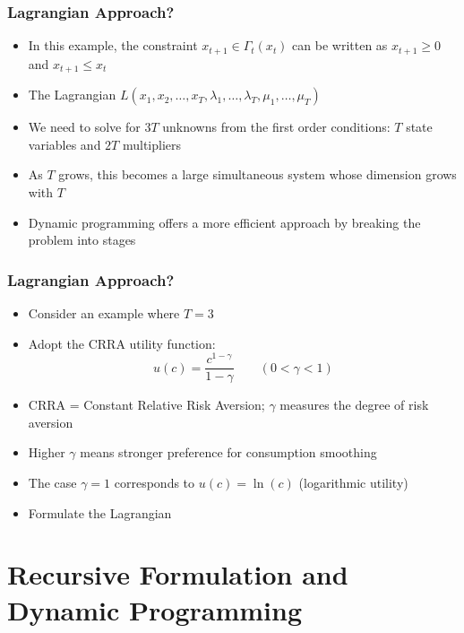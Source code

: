 \documentclass[9pt,aspectratio=169]{beamer}
\begin{document}
\begin{frame}
    \frametitle{Lagrangian Approach?}
    \begin{itemize}
        \item In this example, the constraint $x_{t+1} \in \Gamma_t(x_t)$ can
        be written as $x_{t+1} \geq 0$ and $x_{t+1} \leq x_t$
        \item The Lagrangian $L(x_1, x_2, \ldots, x_T, \lambda_1, \ldots,
        \lambda_T, \mu_1, \ldots, \mu_T)$
        \item We need to solve for $3T$ unknowns from the first order
        conditions: $T$ state variables and $2T$ multipliers
        \item As $T$ grows, this becomes a large simultaneous system whose
        dimension grows with $T$
        \item Dynamic programming offers a more efficient approach by
        breaking the problem into stages
    \end{itemize}
\end{frame}

\begin{frame}
    \frametitle{Lagrangian Approach?}
    \begin{itemize}
        \item Consider an example where $T = 3$
        \item Adopt the CRRA utility function:
        \begin{equation*}
            u(c) = \frac{c^{1-\gamma}}{1-\gamma} \qquad (0 < \gamma < 1)
        \end{equation*}
        \item CRRA = Constant Relative Risk Aversion; $\gamma$ measures
        the degree of risk aversion
        \item Higher $\gamma$ means stronger preference for consumption smoothing
        \item The case $\gamma = 1$ corresponds to $u(c) = \ln(c)$
        (logarithmic utility)
        \item Formulate the Lagrangian
    \end{itemize}
\end{frame}

\section{Recursive Formulation and Dynamic Programming}
\end{document}
